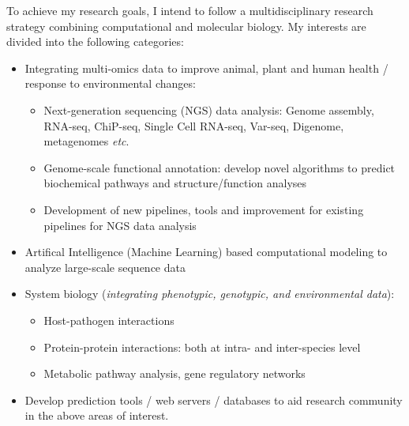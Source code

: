 
\hfill\par
To achieve my research goals, I intend to follow a multidisciplinary research strategy combining computational and molecular biology. 
My interests are divided into the following categories:
\begin{itemize}
\item Integrating multi-omics data to improve  animal, plant and human health / response to environmental changes:
\begin{itemize}
\item Next-generation sequencing (NGS) data analysis: Genome assembly, RNA-seq, ChiP-seq, Single Cell RNA-seq, Var-seq, Digenome, metagenomes \textit{etc}.
\item Genome-scale functional annotation: develop novel algorithms to predict biochemical pathways and structure/function analyses
\item Development of new pipelines, tools and improvement for existing pipelines for NGS data analysis
\end{itemize}
\item Artifical Intelligence (Machine Learning) based computational modeling to analyze large-scale sequence data
\item System biology (\textit{integrating phenotypic, genotypic, and environmental data}):
\begin{itemize}
\item Host-pathogen interactions
\item Protein-protein interactions: both at intra- and inter-species level
\item Metabolic pathway analysis, gene regulatory networks
\end{itemize}
\item Develop prediction tools / web servers / databases to aid research community in the above areas of interest.

\end{itemize}